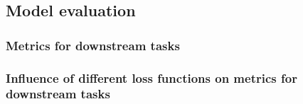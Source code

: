 \subsection{Model evaluation}
    \label{section:model-evaluation}
    \subsubsection{Metrics for downstream tasks}
        
    \subsubsection{Influence of different loss functions on metrics for downstream tasks}
